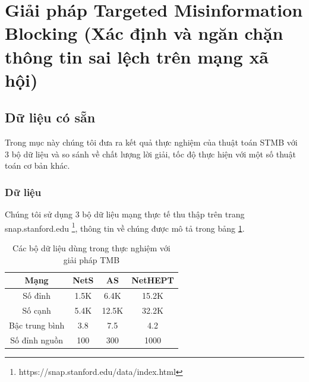 \section{Giải pháp Targeted Misinformation Blocking (Xác định và ngăn chặn thông tin sai lệch trên mạng xã hội)}
\subsection{Dữ liệu có sẵn}	

Trong mục này chúng tôi đưa ra kết quả thực nghiệm của thuật toán STMB với 3 bộ dữ liệu và so sánh về chất lượng lời giải, tốc độ thực hiện với một số thuật toán cơ bản khác.
\subsubsection{Dữ liệu}
Chúng tôi sử dụng 3 bộ dữ liệu mạng thực tế thu thập trên trang snap.stanford.edu \footnote{https://snap.stanford.edu/data/index.html}, thông tin về chúng được mô tả trong bảng \ref{TMB:table}. 
\begin{table}[h]
	\centering
	\begin{tabular}{|c|c|c|c|}
		\hline 
		Mạng & NetS \cite{NetS} & AS \cite{AS} & NetHEPT \cite{kemple1, chen10LT}\\ 
		\hline 
		Số đỉnh & 1.5K & 6.4K & 15.2K \\ 
		\hline 
		Số cạnh & 5.4K & 12.5K & 32.2K\\ 
		\hline 
		Bậc trung bình & 3.8 & 7.5 & 4.2\\ 
		\hline 
		Số đỉnh nguồn & 100 & 300 & 1000\\ 
		\hline 
	\end{tabular} 
	\caption{Các bộ dữ liệu dùng trong thực nghiệm với giải pháp TMB}
	\label{TMB:table}
\end{table}

